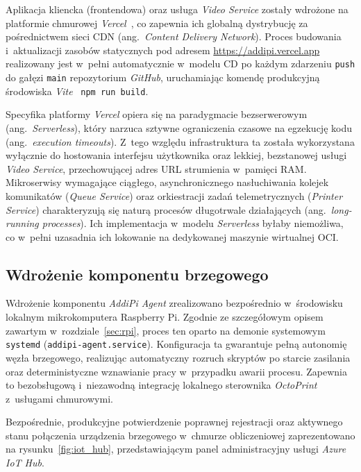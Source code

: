 \documentclass[a4paper,12pt,reqno]{article}
\begin{document}
Aplikacja kliencka (frontendowa) oraz usługa \textit{Video Service} zostały wdrożone na platformie chmurowej \textit{Vercel}~\cite{vercel}, co zapewnia ich globalną dystrybucję za pośrednictwem sieci CDN (ang.~\textit{Content Delivery Network}). Proces budowania i~aktualizacji zasobów statycznych pod adresem \url{https://addipi.vercel.app} realizowany jest w~pełni automatycznie w~modelu CD po każdym zdarzeniu \texttt{push} do gałęzi \texttt{main} repozytorium \textit{GitHub}, uruchamiając komendę produkcyjną środowiska \textit{Vite}~\cite{vite} \texttt{npm run build}.

Specyfika platformy \textit{Vercel} opiera się na paradygmacie bezserwerowym (ang.~\textit{Serverless}), który narzuca sztywne ograniczenia czasowe na egzekucję kodu (ang.~\textit{execution timeouts}). Z~tego względu infrastruktura ta została wykorzystana wyłącznie do hostowania interfejsu użytkownika oraz lekkiej, bezstanowej usługi \textit{Video Service}, przechowującej adres URL strumienia w~pamięci RAM. Mikroserwisy wymagające ciągłego, asynchronicznego nasłuchiwania kolejek komunikatów (\textit{Queue Service}) oraz orkiestracji zadań telemetrycznych (\textit{Printer Service}) charakteryzują się naturą procesów długotrwale działających (ang.~\textit{long-running processes}). Ich implementacja w~modelu \textit{Serverless} byłaby niemożliwa, co w~pełni uzasadnia ich lokowanie na dedykowanej maszynie wirtualnej OCI.

\subsection{Wdrożenie komponentu brzegowego}

Wdrożenie komponentu \textit{AddiPi Agent} zrealizowano bezpośrednio w~środowisku lokalnym mikrokomputera Raspberry Pi. Zgodnie ze szczegółowym opisem zawartym w~rozdziale~\ref{sec:rpi}, proces ten oparto na demonie systemowym \texttt{systemd} (\texttt{addipi-agent.service}). Konfiguracja ta gwarantuje pełną autonomię węzła brzegowego, realizując automatyczny rozruch skryptów po starcie zasilania oraz deterministyczne wznawianie pracy w~przypadku awarii procesu. Zapewnia to bezobsługową i~niezawodną integrację lokalnego sterownika \textit{OctoPrint} z~usługami chmurowymi. 

Bezpośrednie, produkcyjne potwierdzenie poprawnej rejestracji oraz aktywnego stanu połączenia urządzenia brzegowego w~chmurze obliczeniowej zaprezentowano na rysunku~\ref{fig:iot_hub}, przedstawiającym panel administracyjny usługi \textit{Azure IoT Hub}.
\end{document}
